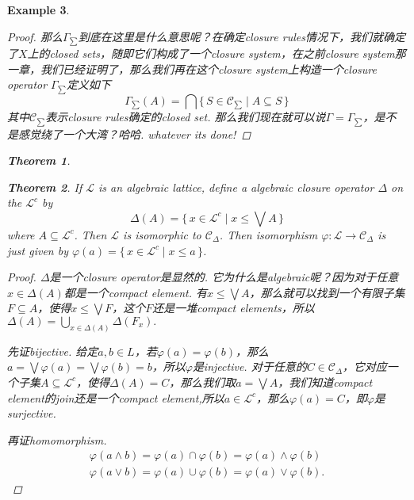\documentclass{article}
\newtheorem{theorem}{Theorem}[section]
\newtheorem{example}[theorem]{Example}
\newcommand*{\xfunc}[4]{{#2}\colon{#3}{#1}{#4}}
\newcommand*{\func}[3]{\xfunc{\to}{#1}{#2}{#3}}
\newcommand\Set[2]{\{\,#1\mid#2\,\}} %
\newcommand\lattice{\mathcal{L}}
\begin{document}
\begin{example}
\begin{proof}
那么$\Gamma_{\sum}$到底在这里是什么意思呢？在确定closure rules情况下，我们就确定了$X$上的closed sets，随即它们构成了一个closure system，在之前closure system那一章，我们已经证明了，那么我们再在这个closure system上构造一个closure operator $\Gamma_{\sum}$定义如下
$$
\Gamma_{\sum}(A) = \bigcap \Set{S \in \mathcal{C}_{\sum}}{ A \subseteq S}
$$
其中$\mathcal{C}_{\sum}$表示closure rules确定的closed set. 那么我们现在就可以说$\Gamma = \Gamma_{\sum}$，是不是感觉绕了一个大湾？哈哈. whatever its done!

\end{proof}

\begin{theorem}

\end{theorem}

\begin{theorem}
\rm If $\lattice$ is an algebraic lattice, define a algebraic closure operator $\Delta$ on the $\lattice^c$ by
$$
	\Delta(A) = \Set{x \in \lattice^c}{x \leq \bigvee A}
$$ 
where $A \subseteq \lattice^c$. Then $\lattice$ is isomorphic to $\mathcal{C}_\Delta$. Then isomorphism $\func{\varphi}{\lattice}{\mathcal{C}_\Delta}$ is just given by $\varphi(a) = \Set{x \in \lattice^c}{x \leq a}$.
\end{theorem}

\begin{proof}
$\Delta$是一个closure operator是显然的. 它为什么是algebraic呢？因为对于任意$x \in \Delta(A)$都是一个compact element. 有$x \leq \bigvee A$，那么就可以找到一个有限子集$F \subseteq A$，使得$x \leq \bigvee F$，这个$F$还是一堆compact elements，所以$\Delta(A) = \bigcup\limits_{x \in \Delta(A)} \Delta(F_x).$

先证bijective. 给定$a,b \in L$，若$\varphi(a) = \varphi(b)$，那么$a = \bigvee \varphi(a) = \bigvee \varphi(b) = b$，所以$\varphi$是injective. 对于任意的$C \in \mathcal{C}_\Delta$，它对应一个子集$A \subseteq \lattice^c$，使得$\Delta(A) = C$，那么我们取$a = \bigvee A$，我们知道compact element的join还是一个compact element,所以$a \in \lattice^c$，那么$\varphi(a) = C$，即$\varphi$是surjective.

再证homomorphism. 
$$
\begin{aligned}
\varphi(a \wedge b) = \varphi(a) \cap \varphi(b) = \varphi(a) \wedge \varphi(b) \\
\varphi(a \vee b) = \varphi(a) \cup \varphi(b) = \varphi(a) \vee \varphi(b).
\end{aligned}
$$
\end{proof}	

\end{example}
\end{document}
